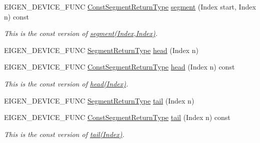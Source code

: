 \begin{DoxyCompactItemize}
E\+I\+G\+E\+N\+\_\+\+D\+E\+V\+I\+C\+E\+\_\+\+F\+U\+NC \mbox{\hyperlink{class_eigen_1_1_vector_block}{Const\+Segment\+Return\+Type}} \mbox{\hyperlink{class_eigen_1_1_dense_base_af8f140343838bb04b92f511a953185f3}{segment}} (Index start, Index n) const
\begin{DoxyCompactList}\small\item\em This is the const version of \mbox{\hyperlink{class_eigen_1_1_dense_base_a12704b924ecc7161a38b123901e9cc9e}{segment(\+Index,\+Index)}}. \end{DoxyCompactList}\item 
E\+I\+G\+E\+N\+\_\+\+D\+E\+V\+I\+C\+E\+\_\+\+F\+U\+NC \mbox{\hyperlink{class_eigen_1_1_vector_block}{Segment\+Return\+Type}} \mbox{\hyperlink{class_eigen_1_1_dense_base_ac05a64c0740a6935f9d5d2a3558737e9}{head}} (Index n)
\item 
\mbox{\label{class_eigen_1_1_dense_base_a13fa8d3636fbd9810b971c2c5fe3b159}} 
E\+I\+G\+E\+N\+\_\+\+D\+E\+V\+I\+C\+E\+\_\+\+F\+U\+NC \mbox{\hyperlink{class_eigen_1_1_vector_block}{Const\+Segment\+Return\+Type}} \mbox{\hyperlink{class_eigen_1_1_dense_base_a13fa8d3636fbd9810b971c2c5fe3b159}{head}} (Index n) const
\begin{DoxyCompactList}\small\item\em This is the const version of \mbox{\hyperlink{class_eigen_1_1_dense_base_ac05a64c0740a6935f9d5d2a3558737e9}{head(\+Index)}}. \end{DoxyCompactList}\item 
E\+I\+G\+E\+N\+\_\+\+D\+E\+V\+I\+C\+E\+\_\+\+F\+U\+NC \mbox{\hyperlink{class_eigen_1_1_vector_block}{Segment\+Return\+Type}} \mbox{\hyperlink{class_eigen_1_1_dense_base_aec3cf8f4f73c641d21a2c080c3e59662}{tail}} (Index n)
\item 
\mbox{\label{class_eigen_1_1_dense_base_ae420c5363c12e290ee1bcbc8a13ecaa0}} 
E\+I\+G\+E\+N\+\_\+\+D\+E\+V\+I\+C\+E\+\_\+\+F\+U\+NC \mbox{\hyperlink{class_eigen_1_1_vector_block}{Const\+Segment\+Return\+Type}} \mbox{\hyperlink{class_eigen_1_1_dense_base_ae420c5363c12e290ee1bcbc8a13ecaa0}{tail}} (Index n) const
\begin{DoxyCompactList}\small\item\em This is the const version of \mbox{\hyperlink{class_eigen_1_1_dense_base_aec3cf8f4f73c641d21a2c080c3e59662}{tail(\+Index)}}. \end{DoxyCompactList}\item 

\end{DoxyCompactItemize}
